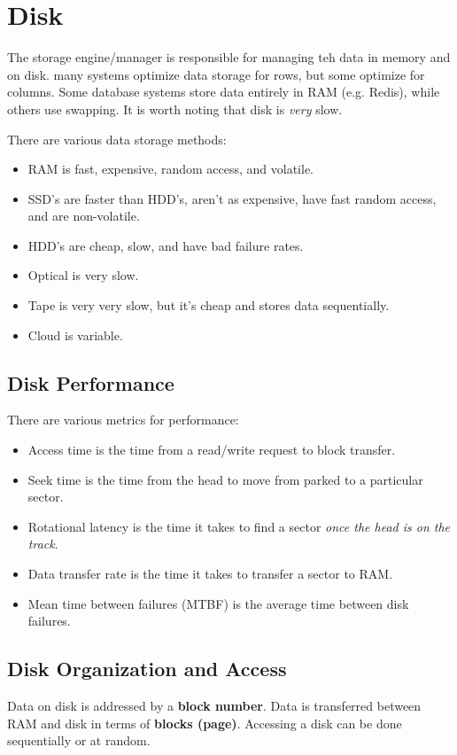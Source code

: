 \documentclass{report}
\renewcommand{\bf}[1]{\textbf{{#1}}}
\renewcommand{\it}[1]{\textit{{#1}}}
\begin{document}
\section{Disk}
The storage engine/manager is responsible for managing teh data in memory and on
disk. many systems optimize data storage for rows, but some optimize for
columns. Some database systems store data entirely in RAM (e.g. Redis), while
others use swapping. It is worth noting that disk is \it{very} slow.

There are various data storage methods:
\begin{itemize}[label=$\to$]
    \item RAM is fast, expensive, random access, and volatile.
    \item SSD's are faster than HDD's, aren't as expensive, have fast random
        access, and are non-volatile.
    \item HDD's are cheap, slow, and have bad failure rates.
    \item Optical is very slow.
    \item Tape is very very slow, but it's cheap and stores data sequentially.
    \item Cloud is variable.
\end{itemize}

\subsection{Disk Performance}
There are various metrics for performance:
\begin{itemize}[label=$\to$]
    \item Access time is the time from a read/write request to block transfer.
    \item Seek time is the time from the head to move from parked to a
        particular sector.
    \item Rotational latency is the time it takes to find a sector
        \it{once the head is on the track}.
    \item Data transfer rate is the time it takes to transfer a sector to RAM.
    \item Mean time between failures (MTBF) is the average time between disk failures.
\end{itemize}

\subsection{Disk Organization and Access}
Data on disk is addressed by a \bf{block number}. Data is transferred between
RAM and disk in terms of \bf{blocks (page)}. Accessing a disk can be done
sequentially or at random.
\end{document}

